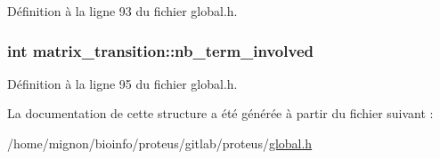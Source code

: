 Définition à la ligne 93 du fichier global.\+h.

\hypertarget{structmatrix__transition_a437f19111dafafa7077ae791daa2cf0e}{
\subsubsection[{nb\+\_\+term\+\_\+involved}]{\setlength{\rightskip}{0pt plus 5cm}int matrix\+\_\+transition\+::nb\+\_\+term\+\_\+involved}}\label{structmatrix__transition_a437f19111dafafa7077ae791daa2cf0e}


Définition à la ligne 95 du fichier global.\+h.



La documentation de cette structure a été générée à partir du fichier suivant \+:\begin{DoxyCompactItemize}
\item 
/home/mignon/bioinfo/proteus/gitlab/proteus/\hyperlink{global_8h}{global.\+h}\end{DoxyCompactItemize}
